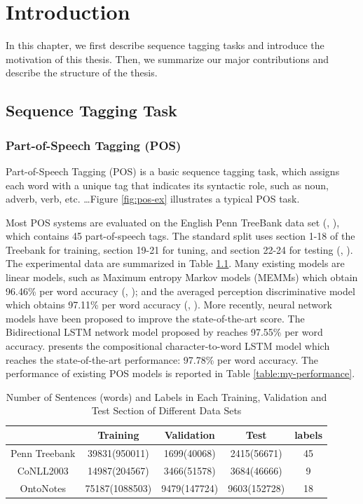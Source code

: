 \chapter{Introduction}

In this chapter, we first describe sequence tagging tasks and introduce the motivation of this thesis. Then, we summarize our major contributions and describe the structure of the thesis.

\section{Sequence Tagging Task}

\subsection{Part-of-Speech Tagging (POS)}
Part-of-Speech Tagging (POS) is a basic sequence tagging task, which assigns each word with a unique tag that indicates its syntactic role, such as noun, adverb, verb, etc. \dots Figure \ref{fig:pos-ex} illustrates a typical POS task. 

Most POS systems are evaluated on the English Penn TreeBank data set (\citeauthor{marcus1993building}, \citeyear{marcus1993building}), which contains 45 part-of-speech tags. The standard split uses section 1-18 of the Treebank for training, section 19-21 for tuning, and section 22-24 for testing (\citeauthor{toutanova2003feature}, \citeyear{toutanova2003feature}). The experimental data are summarized in Table \ref{table:my-dataset}. Many existing models are linear models, such as Maximum entropy Markov models (MEMMs) which obtain 96.46\% per word accuracy (\citeauthor{mccallum2000maximum}, \citeyear{mccallum2000maximum}); and the averaged perception discriminative model which obtains 97.11\% per word accuracy (\citeauthor{collins2002discriminative}, \citeyear{collins2002discriminative}). More recently, neural network models have been proposed to improve the state-of-the-art score. The Bidirectional LSTM network model proposed by \cite{huang2015bidirectional} reaches 97.55\% per word accuracy. \cite{ling2015finding} presents the compositional character-to-word LSTM model which reaches the state-of-the-art performance: 97.78\% per word accuracy. The performance of existing POS models is reported in Table \ref{table:my-performance}.

\begin{table}[]
\centering
\caption{Number of Sentences (words) and Labels in Each Training, Validation and Test Section of Different Data Sets}
\label{table:my-dataset}
\begin{tabular}{|c|c|c|c|c|} \hline
      & Training  & Validation  & Test  & labels  \\ \hline
Penn Treebank   &39831(950011) &1699(40068) &2415(56671) &45\\\hline
CoNLL2003   &14987(204567) &3466(51578) &3684(46666) &9     \\\hline
OntoNotes   &75187(1088503) &9479(147724) &9603(152728) &18     \\\hline
\end{tabular}
\end{table}


